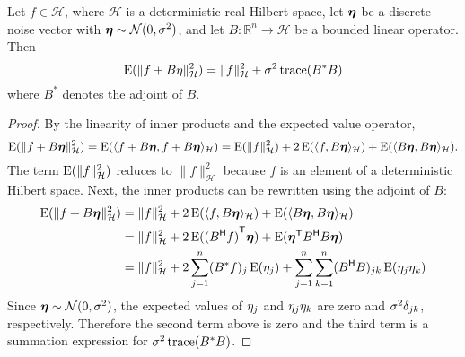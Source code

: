 \begin{lemma}
Let $f \in \mathcal{H}$, where $\mathcal{H}$ is a deterministic real Hilbert space, let $\boldsymbol{\eta}$ be a discrete noise vector with $\boldsymbol{\eta} \sim \mathcal{N}(0,\sigma^2)$, and let $B: \mathbb{R}^n \rightarrow \mathcal{H}$ be a bounded linear operator. Then
\[\operatorname{E}(\|f + B\eta\|_{\mathcal{H}}^2) = \|f\|_{\mathcal{H}}^2 + \sigma^2\operatorname{trace}({B^*}B)\]
where $B^*$ denotes the adjoint of $B$.
\end{lemma}
\begin{proof}
By the linearity of inner products and the expected value operator,
\[\operatorname{E}(\|f + B\boldsymbol{\eta}\|_{\mathcal{H}}^2) = \operatorname{E}(\langle f + B\boldsymbol{\eta}, f + B\boldsymbol{\eta}\rangle_{\mathcal{H}}) = \operatorname{E}(\|f\|_{\mathcal{H}}^2) + 2\operatorname{E}(\langle f, B\boldsymbol{\eta}\rangle_{\mathcal{H}}) + \operatorname{E}(\langle B\boldsymbol{\eta}, B\boldsymbol{\eta}\rangle_{\mathcal{H}}).\]
The term $\operatorname{E}(\|f\|_{\mathcal{H}}^2)$ reduces to $\|f\|_{\mathcal{H}}^2$ because $f$ is an element of a deterministic Hilbert space. Next, the inner products can be rewritten using the adjoint of $B$:
\begin{align*}
\operatorname{E}(\|f + B\boldsymbol{\eta}\|_{\mathcal{H}}^2) &= \|f\|_{\mathcal{H}}^2 + 2\operatorname{E}(\langle f, B\boldsymbol{\eta}\rangle_{\mathcal{H}}) + \operatorname{E}(\langle B\boldsymbol{\eta}, B\boldsymbol{\eta}\rangle_{\mathcal{H}}) \\
&= \|f\|_{\mathcal{H}}^2 + 2\operatorname{E}({({{B}^\mathsf{H}}f)}^\mathsf{T}\boldsymbol{\eta}) + \operatorname{E}({{\boldsymbol{\eta}}^\mathsf{T}}{{B}^\mathsf{H}}B\boldsymbol{\eta}) \\
&= \|f\|_{\mathcal{H}}^2 + 2\sum_{j=1}^n ({B^*}f)_j \operatorname{E}(\eta_j) + \sum_{j=1}^n\sum_{k=1}^n ({{B}^\mathsf{H}}B)_{jk} \operatorname{E}({\eta_j}{\eta_k})
\end{align*}
Since $\boldsymbol{\eta} \sim \mathcal{N}(0,\sigma^2)$, the expected values of $\eta_j$ and ${\eta_j}{\eta_k}$ are zero and $\sigma^2\delta_{jk}$, respectively. Therefore the second term above is zero and the third term is a summation expression for $\sigma^2\operatorname{trace}({B^*}B)$.
\end{proof}

